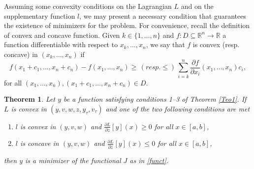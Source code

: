 \documentclass[10pt]{article}
\newtheorem{theorem}{Theorem}
\begin{document}
Assuming some convexity conditions on the Lagrangian $L$ and on the supplementary function $l$, we may present a necessary condition that guarantees the existence
of minimizers for the problem. For convenience, recall the definition of convex and concave function. Given $k\in\{1,\ldots,n\}$ and $f:D\subseteq\mathbb{R}^n\to \mathbb{R}$ a
 function differentiable with respect to $x_k,\ldots,x_n$, we say that $f$ is convex (resp. concave) in  $(x_k,\ldots,x_n)$ if
$$f(x_1+c_1,\ldots,x_n+c_n)-f(x_1,\ldots,x_n)\geq \, (resp. \leq) \, \sum_{i=k}^n\frac{\partial f}{\partial x_i}(x_1,\ldots,x_n)c_i,$$
for all $(x_1,\ldots,x_n),(x_1+c_1,\ldots,x_n+c_n)\in D$.


\begin{theorem} Let $y$ be a function satisfying conditions 1--3 of Theorem \ref{Teo1}. If $L$ is convex in $(y,v,w,z,y_\tau,v_\tau)$ and one of the two following
conditions are met
\begin{enumerate}
\item $l$ is convex in $(y,v,w)$ and $\frac{\partial L}{\partial z}[y](x) \geq 0$ for all $x \in [a,b]$,
\item $l$ is concave in $(y,v,w)$ and $\frac{\partial L}{\partial z}[y](x) \leq 0$ for all $x \in [a,b]$,
\end{enumerate}
then $y$ is a minimizer of the functional $J$ as in \eqref{funct}.
\end{theorem}
\end{document}
